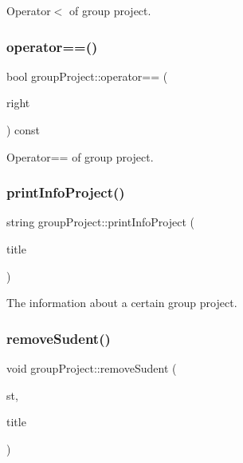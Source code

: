 Operator$<$ of group project. 

\mbox{\label{classgroup_project_a4f56536819cb65cf33b36f4ea1d75b13}} 
\subsubsection{\texorpdfstring{operator==()}{operator==()}}
{\footnotesize\ttfamily bool group\+Project\+::operator== (\begin{DoxyParamCaption}\item[{const \hyperlink{classgroup_project}{group\+Project} $\ast$}]{right }\end{DoxyParamCaption}) const}



Operator== of group project. 

\mbox{\label{classgroup_project_abac981612934adccd4b89a45b5c1b78b}} 
\subsubsection{\texorpdfstring{print\+Info\+Project()}{printInfoProject()}}
{\footnotesize\ttfamily string group\+Project\+::print\+Info\+Project (\begin{DoxyParamCaption}\item[{string}]{title }\end{DoxyParamCaption})}



The information about a certain group project. 

\mbox{\label{classgroup_project_a70388668e291a41025fdd3975f529bae}} 
\subsubsection{\texorpdfstring{remove\+Sudent()}{removeSudent()}}
{\footnotesize\ttfamily void group\+Project\+::remove\+Sudent (\begin{DoxyParamCaption}\item[{\hyperlink{class_student}{Student} $\ast$}]{st,  }\item[{string}]{title }\end{DoxyParamCaption})}




